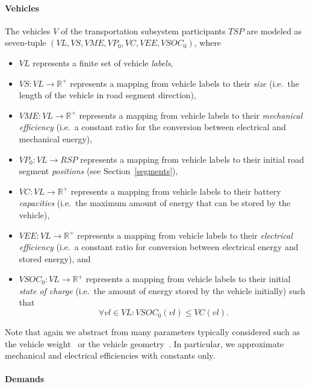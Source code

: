 \paragraph{Vehicles}
\label{vehicles}

The vehicles $V$ of the transportation subsystem participants $TSP$ are modeled as seven-tuple $(VL, VS, VME, VP_0, VC, VEE, VSOC_0)$, where
\begin{itemize}
	\item $VL$ represents a finite set of vehicle \textit{labels},
	\item $VS: VL \rightarrow \mathbb{R}^+$ represents a mapping from vehicle labels to their \textit{size} (i.e.\ the length of the vehicle in road segment direction),
	\item $VME: VL \rightarrow \mathbb{R}^+$ represents a mapping from vehicle labels to their \textit{mechanical efficiency} (i.e.\ a constant ratio for the conversion between electrical and mechanical energy),
	\item $VP_0: VL \rightarrow RSP$ represents a mapping from vehicle labels to their initial road segment \textit{positions} (see Section~\ref{segments}),
	\item $VC: VL \rightarrow \mathbb{R}^+$ represents a mapping from vehicle labels to their battery \textit{capacities} (i.e.\ the maximum amount of energy that can be stored by the vehicle),
	\item $VEE: VL \rightarrow \mathbb{R}^+$ represents a mapping from vehicle labels to their \textit{electrical efficiency} (i.e.\ a constant ratio for conversion between electrical energy and stored energy), and
	\item $VSOC_0: VL \rightarrow \mathbb{R}^+$ represents a mapping from vehicle labels to their initial \textit{state of charge} (i.e.\ the amount of energy stored by the vehicle initially) such that
	\[
		\forall vl \in VL : VSOC_0(vl) \leq VC(vl) \textrm{.}
	\]
\end{itemize}
Note that again we abstract from many parameters typically considered such as the vehicle weight~\cite{?} or the vehicle geometry~\cite{?}. In particular, we approximate mechanical and electrical efficiencies with constants only.

\paragraph{Demands}
\label{demands}

